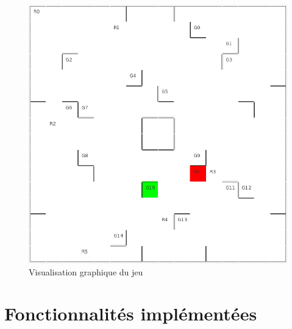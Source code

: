 \documentclass[a4paper]{article} %
\begin{document}
\begin{figure}[htpb]
	\begin{center}
	\includegraphics[scale=0.4]{./images/visuBoard.png}
	\caption{Visualisation graphique du jeu}\label{visuBoard}
	\end{center}
\end{figure}


\section{Fonctionnalités implémentées}
\end{document}
